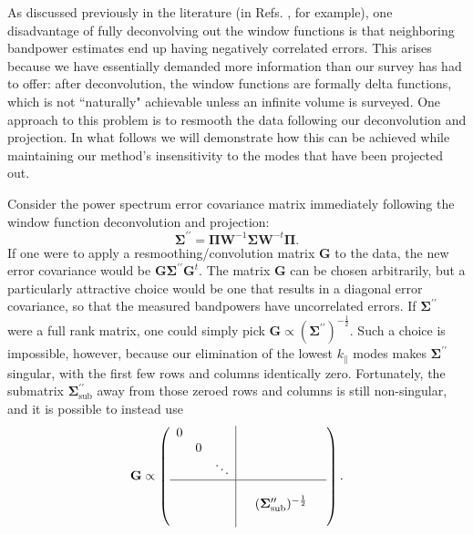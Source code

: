 \documentclass[twocolumn,aps,prd,nofootinbib,showpacs]{revtex4-1}
\begin{document}
As discussed previously in the literature (in Refs. \cite{Dillon2014,Shaw2014b}, for example), one disadvantage of fully deconvolving out the window functions is that neighboring bandpower estimates end up having negatively correlated errors.  This arises because we have essentially demanded more information than our survey has had to offer: after deconvolution, the window functions are formally delta functions, which is not ``naturally" achievable unless an infinite volume is surveyed.  One approach to this problem is to resmooth the data following our deconvolution and projection.  In what follows we will demonstrate how this can be achieved while maintaining our method's insensitivity to the modes that have been projected out.

Consider the power spectrum error covariance matrix immediately following the window function deconvolution and projection:
\begin{equation}
\boldsymbol \Sigma^{\prime \prime} = \boldsymbol \Pi  \mathbf{W}^{-1} \boldsymbol \Sigma \mathbf{W}^{-t} \boldsymbol \Pi.
\end{equation}
If one were to apply a resmoothing/convolution matrix $\mathbf{G}$ to the data, the new error covariance would be $\mathbf{G} \boldsymbol \Sigma^{\prime \prime} \mathbf{G}^t$.  The matrix $\mathbf{G}$ can be chosen arbitrarily, but a particularly attractive choice would be one that results in a diagonal error covariance, so that the measured bandpowers have uncorrelated errors.  If $\boldsymbol \Sigma^{\prime \prime}$ were a full rank matrix, one could simply pick $\mathbf{G} \propto (\boldsymbol \Sigma^{\prime \prime})^{-\frac{1}{2}}$.  Such a choice is impossible, however, because our elimination of the lowest $k_\parallel$ modes makes $\boldsymbol \Sigma^{\prime \prime}$ singular, with the first few rows and columns identically zero.  Fortunately, the submatrix $\boldsymbol \Sigma^{\prime \prime}_\textrm{sub}$ away from those zeroed rows and columns is still non-singular, and it is possible to instead use
\begin{equation}
\mathbf{G} \propto \left( \begin{array}{ccc|ccc}
0&   & && & \\
& 0 && & &\\
    &  & \ddots & & &\\
  \hline
&  & &&  &   \\
&  & &  & (\boldsymbol \Sigma^{\prime \prime}_\textrm{sub})^{-\frac{1}{2}} &   \\
&  & &  &  &  \\
\end{array}
\right).
\end{equation}
\end{document}
